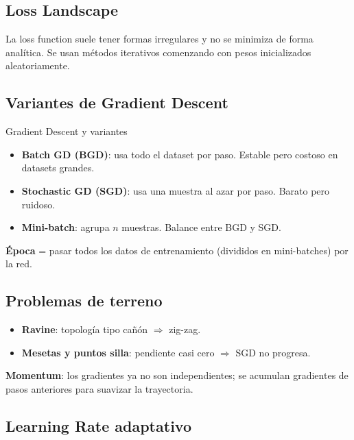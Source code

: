 \documentclass[12pt, a4paper]{article}
\begin{document}
\subsection{Loss Landscape}

La loss function suele tener formas irregulares y no se minimiza de forma analítica. Se usan métodos iterativos comenzando con pesos inicializados aleatoriamente.

\subsection{Variantes de Gradient Descent}

\begin{defbox}{Gradient Descent y variantes}
	\begin{itemize}
		\item \textbf{Batch GD (BGD)}: usa todo el dataset por paso. Estable pero costoso en datasets grandes.
		\item \textbf{Stochastic GD (SGD)}: usa una muestra al azar por paso. Barato pero ruidoso.
		\item \textbf{Mini-batch}: agrupa $n$ muestras. Balance entre BGD y SGD.
	\end{itemize}
	\textbf{Época} = pasar todos los datos de entrenamiento (divididos en mini-batches) por la red.
\end{defbox}

\subsection{Problemas de terreno}

\begin{itemize}
	\item \textbf{Ravine}: topología tipo cañón $\Rightarrow$ zig-zag.
	\item \textbf{Mesetas y puntos silla}: pendiente casi cero $\Rightarrow$ SGD no progresa.
\end{itemize}

\textbf{Momentum}: los gradientes ya no son independientes; se acumulan gradientes de pasos anteriores para suavizar la trayectoria.

\subsection{Learning Rate adaptativo}
\end{document}
